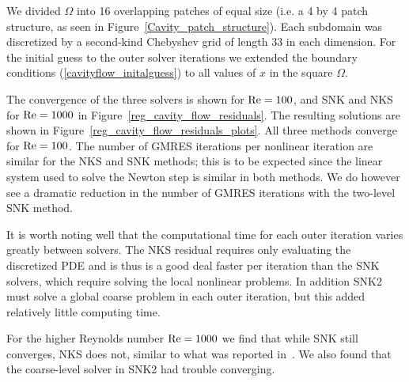 We divided $\Omega$ into 16 overlapping patches of equal size (i.e. a 4 by 4 patch structure, as seen in Figure~\ref{Cavity_patch_structure}). Each subdomain was discretized by a second-kind Chebyshev grid of length 33 in each dimension. For the initial guess to the outer solver iterations we extended the boundary conditions (\ref{cavityflow_initalguess}) to all values of $x$ in the square $\Omega$. 

The convergence of the three solvers is shown for $\text{Re}=100$, and SNK and NKS for $\text{Re} = 1000$ in Figure~\ref{reg_cavity_flow_residuals}. The resulting solutions are shown in Figure~\ref{reg_cavity_flow_residuals_plots}. All three methods converge for $\text{Re} = 100$. The number of GMRES iterations per nonlinear iteration are similar for the NKS and SNK methods; this is to be expected since the linear system used to solve the Newton step is similar in both methods. We do however see a dramatic reduction in the number of GMRES iterations with the two-level SNK method. 

It is worth noting well that the computational time for each outer iteration varies greatly between solvers. The NKS residual requires only evaluating the discretized PDE and is thus is a good deal faster per iteration than the SNK solvers, which require solving the local nonlinear problems. In addition SNK2 must solve a global coarse problem in each outer iteration, but this added relatively little computing time. 

For the higher Reynolds number $\text{Re} = 1000$ we find that while SNK still converges, NKS does not, similar to what was reported in~\cite{Cai2002}. We also found that the coarse-level solver in SNK2 had trouble converging. 


